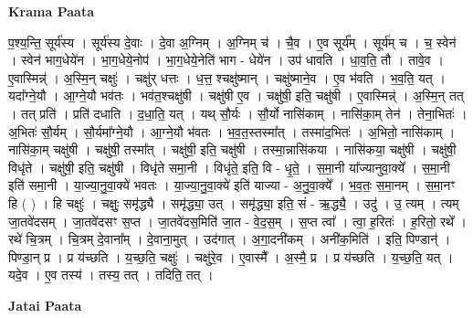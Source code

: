 \documentclass[17pt]{extarticle}
\begin{document}
\textbf{Krama Paata} \newline

प॒श्य॒न्ति॒ सूर्य॑स्य । सूर्य॑स्य दे॒वाः । दे॒वा अ॒ग्निम् । अ॒ग्निम् च॑ । चै॒व । ए॒व सूर्य᳚म् । सूर्य॑म् च । च॒ स्वेन॑ । स्वेन॑ भाग॒धेये॑न । भा॒ग॒धेये॒नोप॑ । भा॒ग॒धेये॒नेति॑ भाग - धेये॑न । उप॑ धावति । धा॒व॒ति॒ तौ । तावे॒व । ए॒वास्मिन्न्॑ । अ॒स्मि॒न् चक्षुः॑ । चक्षु॑र् धत्तः । ध॒त्त॒ श्चक्षु॑ष्मान् । चक्षु॑ष्माने॒व । ए॒व भ॑वति । भ॒व॒ति॒ यत् । यदा᳚ग्ने॒यौ । आ॒ग्ने॒यौ भव॑तः । भव॑त॒श्चक्षु॑षी । चक्षु॑षी ए॒व । चक्षु॑षी॒ इति॒ चक्षु॑षी । ए॒वास्मिन्न्॑ । अ॒स्मि॒न् तत् । तत् प्रति॑ । प्रति॑ दधाति । द॒धा॒ति॒ यत् । यथ् सौ॒र्यः । सौ॒र्यो नासि॑काम् । नासि॑का॒म् तेन॑ । तेना॒भितः॑ । अ॒भितः॑ सौ॒र्यम् । सौ॒र्यमा᳚ग्ने॒यौ । आ॒ग्ने॒यौ भ॑वतः । भ॒व॒त॒स्तस्मा᳚त् । तस्मा॑द॒भितः॑ । अ॒भितो॒ नासि॑काम् । नासि॑का॒म् चक्षु॑षी । चक्षु॑षी॒ तस्मा᳚त् । चक्षु॑षी॒ इति॒ चक्षु॑षी । तस्मा॒न्नासि॑कया । नासि॑कया॒ चक्षु॑षी । चक्षु॑षी॒ विधृ॑ते । चक्षु॑षी॒ इति॒ चक्षु॑षी । विधृ॑ते समा॒नी । विधृ॑ते॒ इति॒ वि - धृ॒ते॒ । स॒मा॒नी या᳚ज्यानुवा॒क्ये᳚ । स॒मा॒नी इति॑ समा॒नी । या॒ज्या॒नु॒वा॒क्ये॑ भवतः । या॒ज्या॒नु॒वा॒क्ये॑ इति॑ याज्या - अ॒नु॒वा॒क्ये᳚ । भ॒व॒तः॒ स॒मा॒नम् । स॒मा॒नꣳ हि ( ) । हि चक्षुः॑ । चक्षुः॒ समृ॑द्ध्यै । समृ॑द्ध्या॒ उत् । समृ॑द्ध्या॒ इति॒ सं - ऋ॒द्ध्यै॒ । उदु॑ । उ॒ त्यम् । त्यम् जा॒तवे॑दसम् । जा॒तवे॑दसꣳ स॒प्त । जा॒तवे॑दस॒मिति॑ जा॒त - वे॒द॒स॒म् । स॒प्त त्वा᳚ । त्वा॒ ह॒रितः॑ । ह॒रितो॒ रथे᳚ । रथे॑ चि॒त्रम् । चि॒त्रम् दे॒वाना᳚म् । दे॒वाना॒मुत् । उद॑गात् । अ॒गा॒दनी॑कम् । अनी॑क॒मिति॑ । इति॒ पिण्डान्॑ । पिण्डा॒न् प्र । प्र य॑च्छति । य॒च्छ॒ति॒ चक्षुः॑ । चक्षु॑रे॒व । ए॒वास्मै᳚ । अ॒स्मै॒ प्र । प्र य॑च्छति । य॒च्छ॒ति॒ यत् । यदे॒व । ए॒व तस्य॑ । तस्य॒ तत् । तदिति॒ तत् । \newline

\textbf{Jatai Paata} \newline
\end{document}
